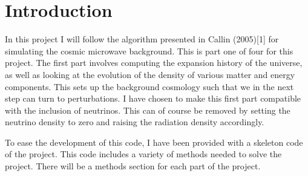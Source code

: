 \documentclass{aa}   %
\begin{document}
  


\section{Introduction}\label{sec:introduction}
In this project I will follow the algorithm presented in Callin (2005)[1] for simulating the cosmic microwave background.  
This is part one of four for this project.
The first part involves computing the expansion history of the universe, as well as looking at the evolution of the density of various matter and energy components. This sets up the background cosmology such that we in the next step can turn to perturbations.
I have chosen to make this first part compatible with the inclusion of neutrinos.
This can of course be removed by setting the neutrino density to zero and raising the radiation density accordingly.

To ease the development of this code, I have been provided with a skeleton code of the project. 
This code includes a variety of methods needed to solve the project. There will be a methods section for each part of the project.

\end{document}
